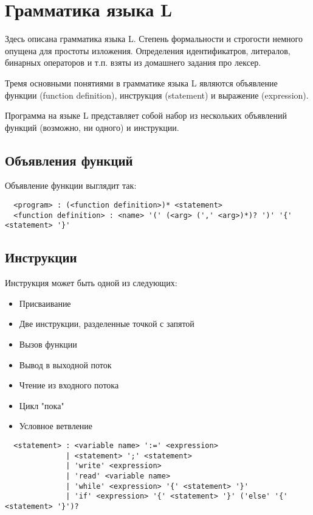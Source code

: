 \documentclass{amsart}
\begin{document}
  \section{Грамматика языка L}

  Здесь описана грамматика языка L. Степень формальности и строгости немного опущена для простоты изложения.
  Определения идентификатров, литералов, бинарных операторов и т.п. взяты из домашнего задания про лексер.

  Тремя основными понятиями в грамматике языка L являются объявление функции (function definition), инструкция 
  (statement) и выражение (expression).

  Программа на языке L представляет собой набор из нескольких объявлений функций (возможно, ни одного) и инструкции.
    
  \subsection{Объявления функций}
  Объявление функции выглядит так:

  \begin{lstlisting}
  <program> : (<function definition>)* <statement>
  <function definition> : <name> '(' (<arg> (',' <arg>)*)? ')' '{' <statement> '}'
  \end{lstlisting}

  \subsection{Инструкции}
  Инструкция может быть одной из следующих:

  \begin{itemize}
      \item Присваивание
      \item Две инструкции, разделенные точкой с запятой
      \item Вызов функции
      \item Вывод в выходной поток
      \item Чтение из входного потока
      \item Цикл "пока"
      \item Условное ветвление
  \end{itemize}

  \begin{lstlisting}
  <statement> : <variable name> ':=' <expression> 
              | <statement> ';' <statement>
              | 'write' <expression>
              | 'read' <variable name>
              | 'while' <expression> '{' <statement> '}'
              | 'if' <expression> '{' <statement> '}' ('else' '{' <statement> '}')?
  \end{lstlisting}
\end{document}
